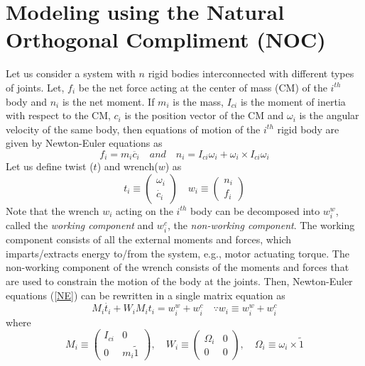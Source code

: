 \section{Modeling using the Natural Orthogonal Compliment (NOC)}
Let us consider a system with $n$ rigid bodies interconnected with different types of joints. 
Let, $f_i$ be the net force acting at the center of mass (CM) of the $i^{th}$  body and $n_i$ is the net moment.
 If $m_i$ is the mass, $I_{ci}$ is the  moment of inertia with respect to the CM, $c_i$ is the position vector of the CM and $\omega_i$ is the angular velocity of the same body, then equations of motion of the $i^{th}$ rigid body are given by Newton-Euler equations as 
\begin{equation}
\label{NE}
f_i=m_i\ddot{c_i} \quad and \quad n_i=I_{ci} \omega_i+\omega_i \times I_{ci} \omega_i
\end{equation}
Let us  define twist ($t$) and wrench($w$) as 
\begin{equation*}
t_i \equiv \begin{pmatrix}
\omega_i\\ \dot{c_i}
\end{pmatrix} \quad
w_i \equiv \begin{pmatrix}
n_i\\f_i
\end{pmatrix}
\end{equation*}
Note that the wrench $w_i$ acting on the $i^{th}$ body can be decomposed into $w^w_i$, called the \textit{working component} and  $w^c_i$, the \textit{non-working component}.
 The working component consists of all the external  moments and forces, which imparts/extracts energy to/from the system, e.g., motor actuating torque.
  The non-working component of the wrench consists of the moments and forces that are used to constrain the motion of the body at the joints.
Then, Newton-Euler equations (\ref{NE}) can be rewritten  in a single matrix equation as 
\begin{equation}
\label{2}
M_i\dot{t_i}+W_iM_it_i=w^w_i+w^c_i \quad \because w_i \equiv w^w_i+w^c_i
\end{equation}
where
\begin{equation}
\label{3}
M_i \equiv \begin{pmatrix}
I_{ci} & 0\\0 & m_i\tilde{1}
\end{pmatrix} ,
\quad W_i\equiv \begin{pmatrix}
\Omega_i &0\\0&0
\end{pmatrix},
\quad
\Omega_i\equiv \omega_i\times \tilde{1}
\end{equation}
